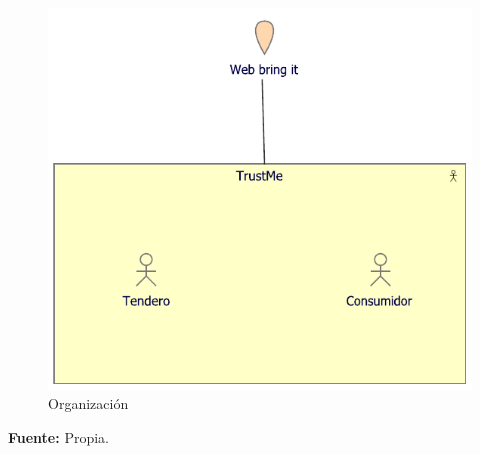 {		\begin{figure}[H]
			\centering
			\includegraphics[width=0.6\linewidth]{development/negocio.pdf}
			\caption{Organización}
		\end{figure}
		\begin{center}
			\textbf{Fuente:} Propia.
		\end{center}
	}
	
